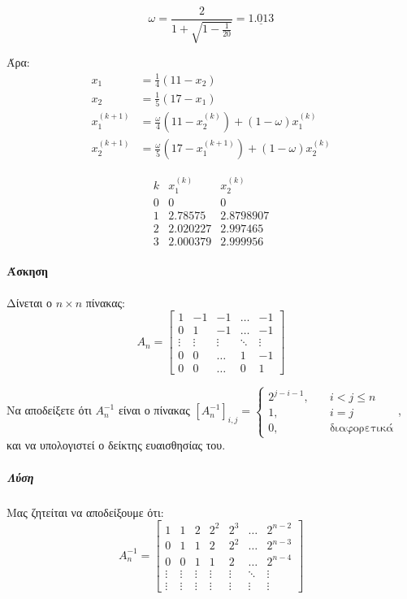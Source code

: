 \documentclass[11pt,a4paper,notitlepage,fleqn]{article}
\begin{document}
\[
\omega = \frac{2}{1+\sqrt{1-\frac{1}{20}}} = \underline{1.013}
\]

Άρα:
\begin{align*}
	x_1 &= \frac{1}{4} (11-x_2) \\
	x_2 &= \frac{1}{5} (17-x_1) \\[3ex]
	x_1^{(k+1)} &= \frac{\omega }{4} \left(11-x_2^{(k)}\right)
	+ (1-\omega )x_1^{(k)} \\
	x_2^{(k+1)} &= \frac{\omega }{5} \left(17-x_1^{(k+1)}\right)
	+ (1-\omega )x_2^{(k)}
\end{align*}

\[
\begin{array}{ccc}
	k & x_1^{(k)} & x_2^{(k)} \\ \hline
	0 &     0     &     0     \\
	1 &  2.78575  & 2.8798907 \\
	2 & 2.020227  & 2.997465  \\
	3 & 2.000379  & 2.999956
\end{array}
\]

\paragraph{Άσκηση}
Δίνεται ο \( n\times n \) πίνακας:
\[
A_n = \left[\begin{matrix}
1 & -1 & -1 & \hdots & -1 \\
0 & 1 & -1 & \hdots & -1 \\
\vdots & \vdots & \vdots & \ddots & \vdots \\
0 & 0 & \hdots & 1 & -1 \\
0 & 0 & \hdots & 0 & 1
\end{matrix}\right]
\]

Να αποδείξετε ότι \( A_{n}^{-1} \) είναι ο πίνακας
\( \left[ A_n^{-1} \right]_{i,j} = \begin{cases}
2^{j-i-1}, \quad & i<j\leq n \\
1, \quad & i=j \\
0,\quad & \text{διαφορετικά}
\end{cases} \), και να υπολογιστεί ο δείκτης ευαισθησίας του.

\subparagraph{Λύση}
Μας ζητείται να αποδείξουμε ότι:
\[
A_n^{-1} = \left[\begin{matrix}
1 & 1 & 2 & 2^2 & 2^3 & \hdots & 2^{n-2} \\
0 & 1 & 1 & 2 & 2^2 & \hdots & 2^{n-3} \\
0 & 0 & 1 & 1 & 2 & \hdots & 2^{n-4} \\
\vdots & \vdots & \vdots & \vdots &\vdots &\ddots & \vdots \\
\vdots & \vdots & \vdots & \vdots &\vdots &\vdots & \vdots
\end{matrix}\right]
\]
\end{document}
